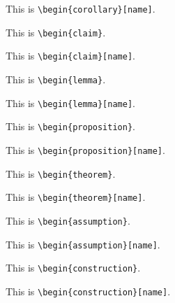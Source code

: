\begin{corollary}[name]
This is \texttt{\textbackslash begin\{corollary\}[name]}.
\end{corollary}

\begin{claim}
This is \texttt{\textbackslash begin\{claim\}}.
\end{claim}

\begin{claim}[name]
This is \texttt{\textbackslash begin\{claim\}[name]}.
\end{claim}

\begin{lemma}\label{lem:lemma5}
This is \texttt{\textbackslash begin\{lemma\}}.
\end{lemma}

\begin{lemma}[name]
This is \texttt{\textbackslash begin\{lemma\}[name]}.
\end{lemma}

\begin{proposition}
This is \texttt{\textbackslash begin\{proposition\}}.
\end{proposition}

\begin{proposition}[name]
This is \texttt{\textbackslash begin\{proposition\}[name]}.
\end{proposition}

\begin{theorem}
This is \texttt{\textbackslash begin\{theorem\}}.
\end{theorem}

\begin{theorem}[name]\label{thm:theorem10}
This is \texttt{\textbackslash begin\{theorem\}[name]}.
\end{theorem}

\begin{assumption}
This is \texttt{\textbackslash begin\{assumption\}}.
\end{assumption}

\begin{assumption}[name]
This is \texttt{\textbackslash begin\{assumption\}[name]}.
\end{assumption}

\begin{construction}
This is \texttt{\textbackslash begin\{construction\}}.
\end{construction}

\begin{construction}[name]
This is \texttt{\textbackslash begin\{construction\}[name]}.
\end{construction}

